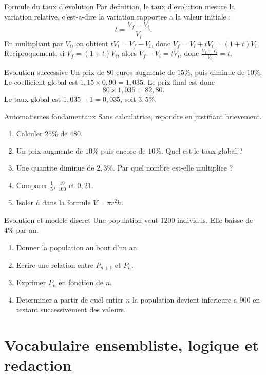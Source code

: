 \documentclass[11pt,a4paper]{article}
\begin{document}
\begin{boitepreuve}{Formule du taux d'evolution}
Par definition, le taux d'evolution mesure la variation relative, c'est-a-dire la variation rapportee a la valeur initiale :
\[
t=\frac{V_f-V_i}{V_i}.
\]
En multipliant par $V_i$, on obtient $tV_i=V_f-V_i$, donc $V_f=V_i+tV_i=(1+t)V_i$.
Reciproquement, si $V_f=(1+t)V_i$, alors $V_f-V_i=tV_i$, donc $\frac{V_f-V_i}{V_i}=t$.
\end{boitepreuve}

\begin{boiteexemple}{Evolution successive}
Un prix de $80$ euros augmente de $15\%$, puis diminue de $10\%$.
Le coefficient global est $1,15\times0,90=1,035$. Le prix final est donc
\[
80\times1,035=82,80.
\]
Le taux global est $1,035-1=0,035$, soit $3,5\%$.
\end{boiteexemple}

\begin{exobox}{Automatismes fondamentaux}
Sans calculatrice, repondre en justifiant brievement.
\begin{enumerate}
  \item Calculer $25\%$ de $480$.
  \item Un prix augmente de $10\%$ puis encore de $10\%$. Quel est le taux global ?
  \item Une quantite diminue de $2,3\%$. Par quel nombre est-elle multipliee ?
  \item Comparer $\frac15$, $\frac{19}{100}$ et $0,21$.
  \item Isoler $h$ dans la formule $V=\pi r^2h$.
\end{enumerate}
\end{exobox}

\begin{exobox}{Evolution et modele discret}
Une population vaut $1200$ individus. Elle baisse de $4\%$ par an.
\begin{enumerate}
  \item Donner la population au bout d'un an.
  \item Ecrire une relation entre $P_{n+1}$ et $P_n$.
  \item Exprimer $P_n$ en fonction de $n$.
  \item Determiner a partir de quel entier $n$ la population devient inferieure a $900$ en testant successivement des valeurs.
\end{enumerate}
\end{exobox}


\section{Vocabulaire ensembliste, logique et redaction}
\end{document}
